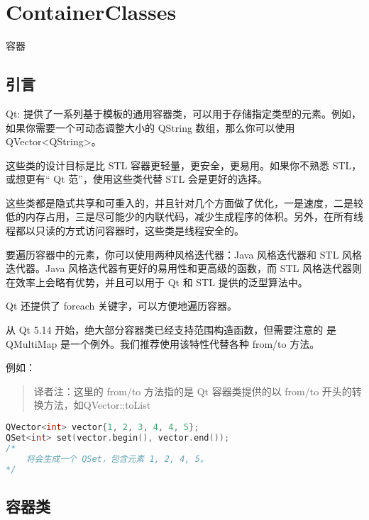 \chapter{ContainerClasses}

容器

\splitLine

\section{引言} 

Qt: 提供了一系列基于模板的通用容器类，可以用于存储指定类型的元素。例如，如果你需要一个可动态调整大小的 QString 数组，那么你可以使用 QVector<QString>。

这些类的设计目标是比 STL 容器更轻量，更安全，更易用。如果你不熟悉 STL，或想更有“ Qt 范”，使用这些类代替 STL 会是更好的选择。

这些类都是隐式共享和可重入的，并且针对几个方面做了优化，一是速度，二是较低的内存占用，三是尽可能少的内联代码，减少生成程序的体积。另外，在所有线程都以只读的方式访问容器时，这些类是线程安全的。

要遍历容器中的元素，你可以使用两种风格迭代器：Java 风格迭代器和 STL 风格迭代器。Java 风格迭代器有更好的易用性和更高级的函数，而 STL 风格迭代器则在效率上会略有优势，并且可以用于 Qt 和 STL 提供的泛型算法中。

Qt 还提供了 foreach 关键字，可以方便地遍历容器。

\begin{notice}
从 Qt 5.14 开始，绝大部分容器类已经支持范围构造函数，但需要注意的
是 QMultiMap 是一个例外。我们推荐使用该特性代替各种 from/to 方法。
\end{notice}

例如：

\begin{quote}
译者注：这里的 from/to 方法指的是 Qt 容器类提供的以 from/to 开头的转换方法，如QVector::toList
\end{quote}

\begin{lstlisting}[language=C++]
QVector<int> vector{1, 2, 3, 4, 4, 5};
QSet<int> set(vector.begin(), vector.end());
/*
    将会生成一个 QSet，包含元素 1, 2, 4, 5。
*/
\end{lstlisting}

\section{容器类}

\splitLine

